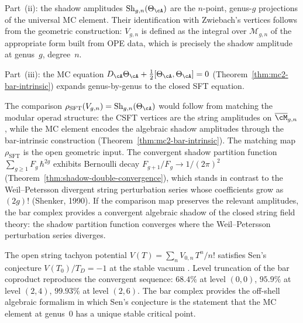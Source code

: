 \begin{remark}
Part~(ii): the shadow amplitudes
$\mathrm{Sh}_{g,n}(\Theta_\cA)$
are the $n$-point, genus-$g$ projections of the
universal MC element. Their identification with
Zwiebach's vertices follows from the geometric
construction: $V_{g,n}$ is defined as the
integral over $\mathcal{M}_{g,n}$ of the appropriate
form built from OPE data, which is precisely the
shadow amplitude at genus~$g$, degree~$n$.

Part~(iii): the MC equation
$D_\cA\Theta_\cA + \tfrac{1}{2}[\Theta_\cA, \Theta_\cA] = 0$
(Theorem~\ref{thm:mc2-bar-intrinsic})
expands genus-by-genus to the closed SFT equation.

The comparison
$\rho_{\mathrm{SFT}}(V_{g,n}) = \mathrm{Sh}_{g,n}(\Theta_\cA)$
would follow from matching the modular operad structure: the CSFT
vertices are the string amplitudes on $\overline{\cM}_{g,n}$, while
the MC element encodes the algebraic shadow amplitudes through the
bar-intrinsic construction
(Theorem~\ref{thm:mc2-bar-intrinsic}). The matching map
$\rho_{\mathrm{SFT}}$ is the open geometric input.
The convergent shadow partition function
$\sum_{g \geq 1} F_g\,\hbar^{2g}$
exhibits Bernoulli decay $F_{g+1}/F_g \to 1/(2\pi)^2$
(Theorem~\ref{thm:shadow-double-convergence}),
which stands in contrast to the Weil--Petersson
divergent string perturbation series
whose coefficients grow as $(2g)!$
(Shenker, 1990).
If the comparison map preserves the relevant amplitudes, the bar
complex provides a convergent algebraic shadow of the closed string
field theory: the shadow partition function converges where the
Weil--Petersson perturbation series diverges.
\end{remark}

\begin{remark}
\label{rem:frontier-tachyon}
The open string tachyon potential
$V(T) = \sum_n V_{0,n}\,T^n/n!$ satisfies
Sen's conjecture $V(T_0)/T_D = -1$ at the stable
vacuum \cite{Sen99}. Level truncation of the bar
coproduct reproduces the convergent sequence:
$68.4\%$ at level $(0,0)$, $95.9\%$ at level $(2,4)$,
$99.93\%$ at level $(2,6)$. The bar complex provides
the off-shell algebraic formalism in which Sen's
conjecture is the statement that the MC element at
genus~$0$ has a unique stable critical point.
\end{remark}

